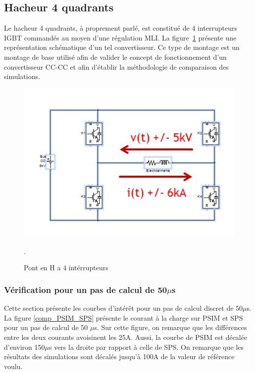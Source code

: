 \documentclass[11pt,letterpaper,final]{report}
\begin{document}
\subsection{Hacheur 4 quadrants}
Le hacheur 4 quadrants, à proprement parlé, est constitué de 4 interrupteurs IGBT commandés au moyen d'une régulation MLI. La figure~\ref{hach} présente une représentation schématique d'un tel convertisseur. Ce type de montage est un montage de base utilisé afin de valider le concept de fonctionnement d'un convertisseur CC-CC et afin d'établir la méthodologie de comparaison des simulations.

\begin{figure}[htb]
\centering
\includegraphics[scale=1]{Fig/Hacheur4Quadrants/Hacheur.jpg}
\caption{Pont en H a 4 intérrupteurs}.
\label{hach}
\end{figure}

\subsubsection{Vérification pour un pas de calcul de 50$\mu$s}
Cette section présente les courbes d'intérêt pour un pas de calcul discret de 50$\mu$s. La figure \ref{comp_PSIM_SPS} présente le courant à la charge sur PSIM et SPS pour un pas de calcul de 50 $\mu$s. Sur cette figure, on remarque que les différences entre les deux courants avoisinent les 25A. Aussi, la courbe de PSIM est décalée d'environ 150$\mu$s vers la droite par rapport à celle de SPS. On remarque que les résultats des simulations sont décalés jusqu'à 100A de la valeur de référence voulu. 
\end{document}
